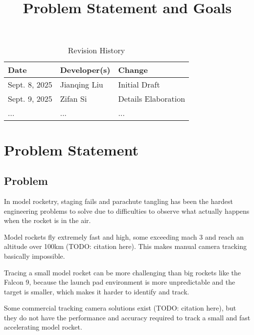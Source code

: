 \documentclass{article}
\title{Problem Statement and Goals\\\progname}
\author{\authname}
\date{}
\begin{document}
\maketitle

\begin{table}[hp]
\caption{Revision History} \label{TblRevisionHistory}
\begin{tabularx}{\textwidth}{llX}
\toprule
\textbf{Date} & \textbf{Developer(s)} & \textbf{Change}\\
\midrule
Sept. 8, 2025 & Jianqing Liu & Initial Draft\\
Sept. 9, 2025 & Zifan Si & Details Elaboration\\
... & ... & ...\\
\bottomrule
\end{tabularx}
\end{table}

\section{Problem Statement}



\subsection{Problem}

In model rocketry, staging fails and parachute tangling has been the hardest engineering problems 
to solve due to difficulties to observe what actually happens when the rocket is in the air.

Model rockets fly extremely fast and high, some exceeding mach 3 and reach an altitude over 100km (TODO: citation here).
This makes manual camera tracking basically impossible.

Tracing a small model rocket can be more challenging than big rockets like the Falcon 9, because the
launch pad environment is more unpredictable and the target is smaller, which makes it harder to identify 
and track.

Some commercial tracking camera solutions exist (TODO: citation here), but they do not have the performance and 
accuracy required to track a small and fast accelerating model rocket.
\end{document}
